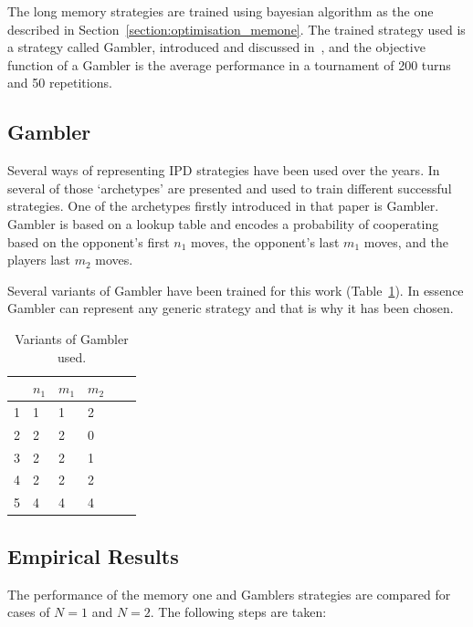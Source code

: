 \documentclass[10pt]{article}
\begin{document}
The long memory strategies are trained using bayesian algorithm as the one described in
Section~\ref{section:optimisation_memone}. The trained strategy used is a strategy called Gambler,
introduced and discussed in~\cite{Harper2017}, and the objective function of a Gambler
is the average performance in a tournament of 200 turns and 50 repetitions.

\subsection{Gambler}

Several ways of representing IPD strategies have been used over the years.
In~\cite{Harper2017} several of those `archetypes' are presented
and used to train different successful strategies. One of the archetypes firstly
introduced in that paper is Gambler. Gambler is based on a lookup table and encodes
a probability of cooperating based on the opponent's first \(n_1\) moves, the opponent's
last \(m_1\) moves, and the players last \(m_2\) moves.

Several variants of Gambler have been trained for this work (Table~\ref{table:gambler}).
In essence Gambler can represent any generic strategy
and that is why it has been chosen.

\begin{table}[htbp]
    \begin{center}
    \begin{tabular}{clllll}
        \toprule
        {}&  \(n_1\) & \(m_1\) & \(m_2\)\\
        \midrule
        1 & 1 & 1 & 2\\
        2 & 2 & 2 & 0\\
        3 & 2 & 2 & 1\\
        4 & 2 & 2 & 2\\
        5 & 4 & 4 & 4\\
        \bottomrule
    \end{tabular}
    \end{center}
    \caption{Variants of Gambler used.}
    \label{table:gambler}
\end{table}

\subsection{Empirical Results}

The performance of the memory one and Gamblers strategies are compared for cases of
\(N=1\) and \(N=2\). The following steps are taken:
\end{document}
